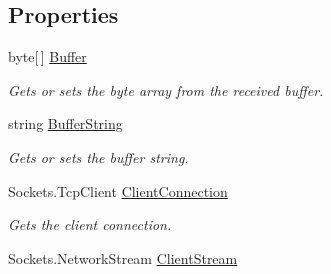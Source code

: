 \subsection*{Properties}
\begin{DoxyCompactItemize}
\item 
\hypertarget{classAsterion_1_1ConnectionState_a0fe988b2f1c7b28d8f96b674aa93e67d}{byte\mbox{[}$\,$\mbox{]} \hyperlink{classAsterion_1_1ConnectionState_a0fe988b2f1c7b28d8f96b674aa93e67d}{Buffer}}\label{classAsterion_1_1ConnectionState_a0fe988b2f1c7b28d8f96b674aa93e67d}

\begin{DoxyCompactList}\small\item\em Gets or sets the byte array from the received buffer. \end{DoxyCompactList}\item 
\hypertarget{classAsterion_1_1ConnectionState_a934a3ae6527d94a6a599cea47bd0eb2e}{string \hyperlink{classAsterion_1_1ConnectionState_a934a3ae6527d94a6a599cea47bd0eb2e}{Buffer\-String}}\label{classAsterion_1_1ConnectionState_a934a3ae6527d94a6a599cea47bd0eb2e}

\begin{DoxyCompactList}\small\item\em Gets or sets the buffer string. \end{DoxyCompactList}\item 
\hypertarget{classAsterion_1_1ConnectionState_ae5a46e3428407458fd7a7d968fdb863d}{Sockets.\-Tcp\-Client \hyperlink{classAsterion_1_1ConnectionState_ae5a46e3428407458fd7a7d968fdb863d}{Client\-Connection}}\label{classAsterion_1_1ConnectionState_ae5a46e3428407458fd7a7d968fdb863d}

\begin{DoxyCompactList}\small\item\em Gets the client connection. \end{DoxyCompactList}\item 
\hypertarget{classAsterion_1_1ConnectionState_a624f53e2ce25a68bd0743af99ff02dd4}{Sockets.\-Network\-Stream \hyperlink{classAsterion_1_1ConnectionState_a624f53e2ce25a68bd0743af99ff02dd4}{Client\-Stream}}\label{classAsterion_1_1ConnectionState_a624f53e2ce25a68bd0743af99ff02dd4}


\end{DoxyCompactItemize}
